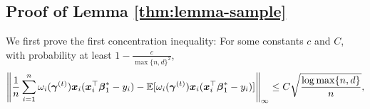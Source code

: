 

\subsection{Proof of Lemma \ref{thm:lemma-sample}} \label{sec:proof-lemma-sample}

%
%
	We first prove the first concentration inequality: For some constants $c$ and $C$, with probability at least $1-\frac{c}{\max\{n, d\}^2}$,
	\begin{equation*}
		 \left\lVert \frac{1}{n}\sum_{i=1}^n \omega_i(\boldsymbol{\gamma}^{(t)}) \boldsymbol{x}_i ( \boldsymbol{x}_i^\top \boldsymbol{\beta}_1^* - y_i) 
			- \mathbb{E}[ \omega_i(\boldsymbol{\gamma}^{(t)}) \boldsymbol{x}_i ( \boldsymbol{x}_i^\top \boldsymbol{\beta}_1^* - y_i) ] \right\rVert_\infty \le  C \sqrt{ \frac{\log \max\{n, d\}}{n}},
	\end{equation*}
